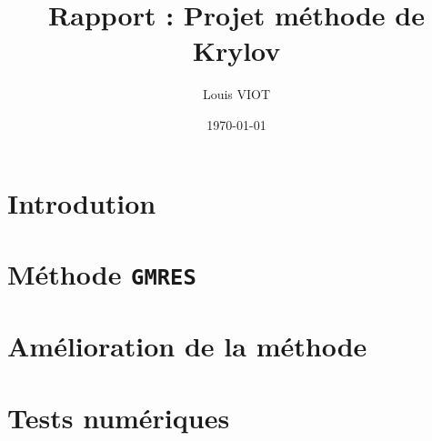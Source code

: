 \documentclass[a4paper,12pt]{article}
\title{\textbf{Rapport : Projet méthode de Krylov}}
\author{Louis VIOT}
\date\today
\begin{document}
\maketitle
\vspace{5cm}
\tableofcontents
\newpage
\section{Introdution}

\newpage
\section{Méthode \texttt{GMRES}}

\section{Amélioration de la méthode}

\newpage
\section{Tests numériques}

\end{document}
